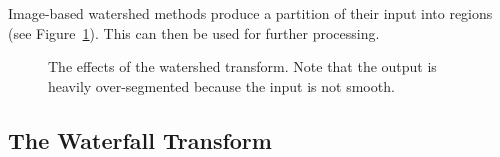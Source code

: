 \documentclass[a4paper]{article}
\newenvironment{stusubfig}[1]
{
	\begin{figure}[#1]
	\begin{center}
}
{
	\end{center}
	\end{figure}
}
\begin{document}
\noindent Image-based watershed methods produce a partition of their input into regions (see Figure~\ref{fig:segmentation-watershed-adfexample}). This can then be used for further processing.

\begin{stusubfig}{t}
	\hspace{4mm}%
\caption{The effects of the watershed transform. Note that the output is heavily over-segmented because the input is not smooth.}
\label{fig:segmentation-watershed-adfexample}
\end{stusubfig}

\subsection{The Waterfall Transform}
\end{document}
